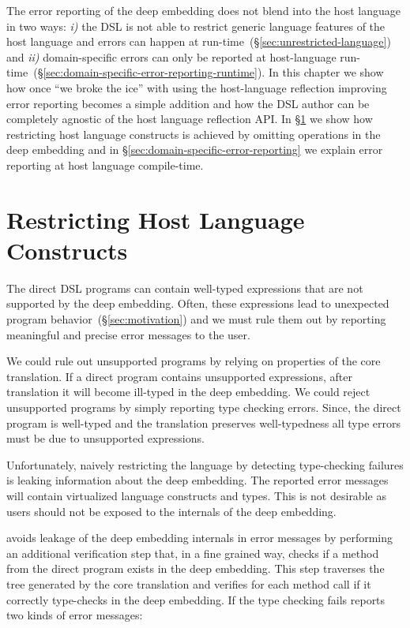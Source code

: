 The error reporting of the deep embedding does not blend into the host language in two ways:
 \emph{i)} the DSL is not able to restrict generic language features of the host language and errors can happen at run-time~(\S \ref{sec:unrestricted-language}) and \emph{ii)} domain-specific errors can only be reported at host-language run-time~(\S \ref{sec:domain-specific-error-reporting-runtime}). In this chapter we show how once ``we broke the ice'' with using the host-language reflection improving error reporting becomes a simple addition and how the DSL author can
 be completely agnostic of the host language reflection API. In \S \ref{sec:restricting} we
 show how restricting host language constructs is achieved by omitting operations in
 the deep embedding and in \S \ref{sec:domain-specific-error-reporting} we explain
 error reporting at host language compile-time.


\section{Restricting Host Language Constructs}
\label{sec:restricting}

The direct DSL programs can contain well-typed expressions that are not
supported by the deep embedding. Often, these expressions lead to unexpected program
behavior~(\S \ref{sec:motivation}) and we must rule them out by reporting meaningful and
precise error messages to the user.

We could rule out unsupported programs by relying on properties of the
core translation. If a direct program contains unsupported expressions, after
translation it will become ill-typed in the deep embedding. We could reject
unsupported programs by simply reporting type checking errors. Since, the
direct program is well-typed and the translation preserves well-typedness all
type errors must be due to unsupported expressions.

Unfortunately, naively restricting the language by detecting type-checking
failures is leaking information about the deep embedding. The reported error
messages will contain virtualized language constructs and types. This is not desirable
as users should not be exposed to the internals of the deep embedding.

\yy avoids leakage of the deep embedding internals in error messages by performing an
additional verification step that, in a fine grained way, checks if a method
from the direct program exists in the deep embedding. This step traverses the
tree generated by the core translation and verifies for each method call if it
correctly type-checks in the deep embedding. If the type checking fails \yy
reports two kinds of error messages:

